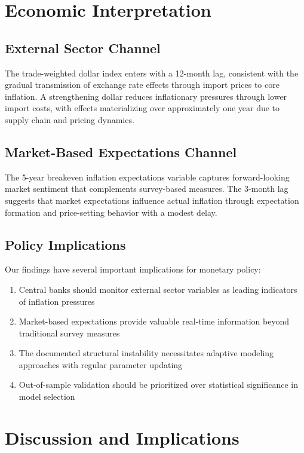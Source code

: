 \documentclass[12pt]{article}
\begin{document}
\section{Economic Interpretation}

\subsection{External Sector Channel}

The trade-weighted dollar index enters with a 12-month lag, consistent with the gradual transmission of exchange rate effects through import prices to core inflation. A strengthening dollar reduces inflationary pressures through lower import costs, with effects materializing over approximately one year due to supply chain and pricing dynamics.

\subsection{Market-Based Expectations Channel}

The 5-year breakeven inflation expectations variable captures forward-looking market sentiment that complements survey-based measures. The 3-month lag suggests that market expectations influence actual inflation through expectation formation and price-setting behavior with a modest delay.

\subsection{Policy Implications}

Our findings have several important implications for monetary policy:

\begin{enumerate}
\item Central banks should monitor external sector variables as leading indicators of inflation pressures
\item Market-based expectations provide valuable real-time information beyond traditional survey measures
\item The documented structural instability necessitates adaptive modeling approaches with regular parameter updating
\item Out-of-sample validation should be prioritized over statistical significance in model selection
\end{enumerate}

\section{Discussion and Implications}
\end{document}
